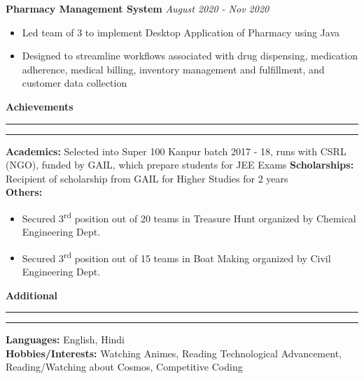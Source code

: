 \documentclass[11pt]{article}
\begin{document}
    	\hspace{8pt}\textbf{Pharmacy Management System}
    	\href{https://github.com/Abhay811/DBMS}{\color{blue}}
    	\hfill
    	\textit{August 2020 - Nov 2020}
    	\vspace{-6pt}
    	\begin{itemize}
        	\setlength{\itemsep}{0pt}
        	\setlength{\parskip}{0pt}
        	\setlength{\parsep}{0pt}
        	\item Led team of 3 to implement Desktop Application of Pharmacy using Java
        	\item Designed to streamline workflows associated with drug dispensing, medication adherence, medical billing, inventory management and fulfillment, and customer data collection
        \end{itemize}
    \textbf{\large{Achievements}}
    	\vspace{5pt}
    	\hrule \hrule
    	\vspace{4pt}
    	\textbf{Academics:} Selected into Super 100 Kanpur batch 2017 - 18, runs with CSRL (NGO), funded by GAIL, which prepare students for JEE Exams
    	\newline
    	\textbf{Scholarships:} Recipient of scholarship from GAIL for Higher Studies for 2 years\\
    	\textbf{Others:}
   	    \begin{itemize}
        	\setlength{\itemsep}{0pt}
        	\setlength{\parskip}{0pt}
        	\setlength{\parsep}{0pt}
        	\item Secured 3\textsuperscript{rd} position out of 20 teams in Treasure Hunt organized by Chemical Engineering Dept.
        	\item Secured 3\textsuperscript{rd} position out of 15 teams in Boat Making organized by Civil Engineering Dept.
    	\end{itemize}
    
    \textbf{\large{Additional}}
    	\vspace{5pt}
    	\hrule \hrule
    	\vspace{4pt}
    	\textbf{Languages:} English, Hindi\\
    	\textbf{Hobbies/Interests:} Watching Animes, Reading Technological Advancement, Reading/Watching about Cosmos, Competitive Coding
    
\end{document}

